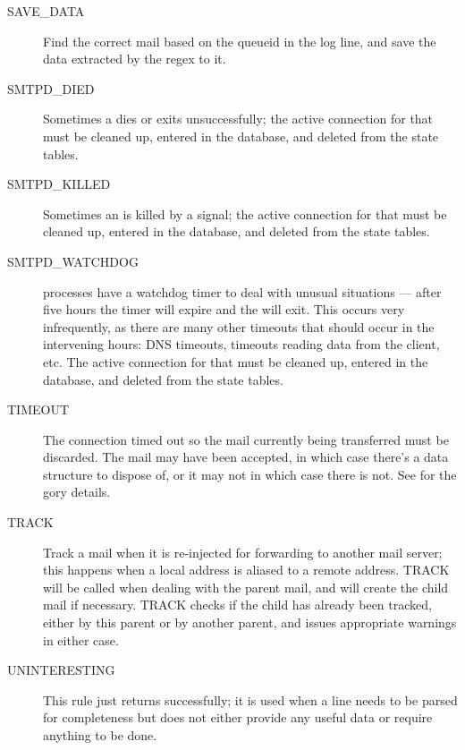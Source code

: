 \begin{description}
    \item [SAVE\_DATA] Find the correct mail based on the queueid in
        the log line, and save the data extracted by the regex to it.

    \item [SMTPD\_DIED] Sometimes a  dies or exits
        unsuccessfully; the active connection for that  must
        be cleaned up, entered in the database, and deleted from the state
        tables.

    \item [SMTPD\_KILLED] Sometimes an  is killed by a
        signal; the active connection for
        that  must be cleaned up, entered in the database,
        and deleted from the state tables.

    \item [SMTPD\_WATCHDOG]  processes have a watchdog timer
        to deal with unusual situations --- after five hours the timer will
        expire and the  will exit.  This occurs very
        infrequently, as there are many other timeouts that should occur
        in the intervening hours: DNS timeouts, timeouts reading data
        from the client, etc\@.  The active connection for that
         must be cleaned up, entered in the database, and
        deleted from the state tables.

    \item [TIMEOUT] The connection timed out so the mail currently being
        transferred must be discarded. The mail may have been accepted, in
        which case there's a data structure to dispose of, or it may not in
        which case there is not.  See
         for the gory details.

    \item [TRACK] Track a mail when it is re-injected for forwarding to
        another mail server; this happens when a local address is aliased
        to a remote address.  TRACK will be called when dealing with the
        parent mail, and will create the child mail if necessary. TRACK
        checks if the child has already been tracked, either by this parent
        or by another parent, and issues appropriate warnings in either
        case.

    \item [UNINTERESTING] This rule just returns successfully; it is used when a
        line needs to be parsed for completeness but does not either
        provide any useful data or require anything to be done.

\end{description}

